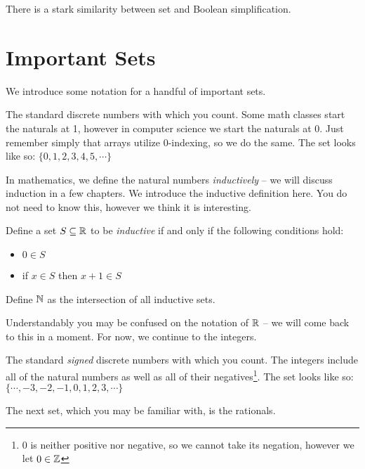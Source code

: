 \documentclass[main.tex]{subfiles}
\begin{document}
\begin{rem}
	There is a stark similarity between set and Boolean simplification.
\end{rem}

\section{Important Sets}

We introduce some notation for a handful of important sets.

\begin{defn}
	The standard discrete numbers with which you count. Some math classes start the naturals at 1, however in computer science we start the naturals at 0. Just remember simply that arrays utilize 0-indexing, so we do the same. The set looks like so: \(\{0,1,2,3,4,5,\cdots\}\)
\end{defn}

In mathematics, we define the natural numbers \textit{inductively} -- we will discuss induction in a few chapters. We introduce the inductive definition here. You do not need to know this, however we think it is interesting.

\begin{prop}
	\label{ind-defn-N}
	Define a set \(S \subseteq \mathbb{R}\) to be \textit{inductive} if and only if the following conditions hold:
	\begin{itemize}
		\item \(0 \in S\)
		\item if \(x \in S\) then \(x + 1 \in S\)
	\end{itemize}
	
	\noindent Define \(\mathbb{N}\) as the intersection of all inductive sets.
\end{prop}

Understandably you may be confused on the notation of \(\mathbb{R}\) -- we will come back to this in a moment. For now, we continue to the integers.

\begin{defn}
	The standard \textit{signed} discrete numbers with which you count. The integers include all of the natural numbers as well as all of their negatives\footnote{0 is neither positive nor negative, so we cannot take its negation, however we let \(0 \in \mathbb{Z}\)}. The set looks like so: \(\{\cdots,-3,-2,-1,0,1,2,3,\cdots\}\)
\end{defn}

The next set, which you may be familiar with, is the rationals.
\end{document}
